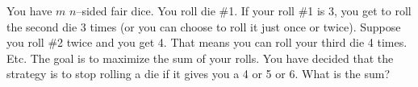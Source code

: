   You have $m$ $n$--sided fair dice.
  You roll die \#1.
  If your roll \#1 is 3, you get to roll the second
  die 3 times (or you can choose to roll it just once
  or twice).
  Suppose you roll \#2 twice and you get 4.
  That means you can roll your third die 4 times.
  Etc.
  The goal is to maximize the sum of your rolls.
  You have decided that the strategy is to stop rolling
  a die
  if it gives you a 4 or 5 or 6.
  What is the sum?
